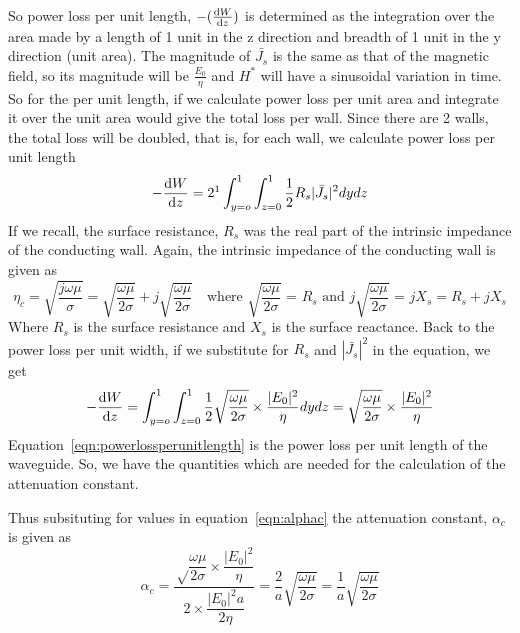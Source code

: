 So power loss per unit length, $-(\derivative{W}{z})$ is determined as the integration over the area made by a length of 1 unit in the z direction and breadth of 1 unit in the y direction (unit area). The magnitude of $ \bar{J_s} $ is the same as that of the magnetic field, so its magnitude will be $ \frac{E_0}{\eta} $ and $H^\ast$ will have a sinusoidal variation in time. So for the per unit length, if we calculate power loss per unit area and integrate it over the unit area would give the total loss per wall. Since there are 2 walls, the total loss will be doubled, that is, for each wall, we calculate power loss per unit length
\begin{equation*}
-\derivative{W}{z} = 2\footnotemark \int_{y=o}^{1} \int_{z=0}^{1}\frac{1}{2}R_s|\bar{J_s}|^2dydz
\end{equation*}
If we recall, the surface resistance, $R_s$ was the real part of the intrinsic impedance of the conducting wall. Again, the intrinsic impedance of the conducting wall is given as
\begin{dmath*}
\eta_c = \sqrt{\frac{j\omega\mu}{\sigma}}
= \sqrt{\frac{\omega\mu}{2\sigma}}+j\sqrt{\frac{\omega\mu}{2\sigma}}\quad\text{where }\sqrt{\frac{\omega\mu}{2\sigma}}\text{ = }R_s\text{ and }j\sqrt{\frac{\omega\mu}{2\sigma}}\text{ = }jX_s
= R_s + jX_s
\end{dmath*}
Where $R_s$ is the surface resistance and $X_s$ is the surface reactance. Back to the power loss per unit width, if we substitute for $R_s$ and $|\bar{J_s}|^2$ in the equation, we get
\begin{dmath}
-\derivative{W}{z} = \int_{y=o}^{1} \int_{z=0}^{1}\frac{1}{2}\sqrt{\frac{\omega\mu}{2\sigma}}\times\frac{|E_0|^2}{\eta}dydz
= \sqrt{\frac{\omega\mu}{2\sigma}}\times\frac{|E_0|^2}{\eta}
\label{eqn:powerlossperunitlength}
\end{dmath}
Equation~\eqref{eqn:powerlossperunitlength} is the power loss per unit length of the waveguide. So, we have the quantities which are needed for the calculation of the attenuation constant.

Thus subsituting for values in equation~\eqref{eqn:alphac} the attenuation constant, $\alpha_c$ is given as 
\begin{dmath}
\alpha_c = \frac{\sqrt\dfrac{\omega\mu}{2 \sigma}\times\dfrac{|E_0|^2}{\eta}}{2 \times \dfrac{|E_0|^2 a}{2 \eta}}
= \frac{2}{a}\sqrt{\frac{\omega\mu}{2\sigma}}=\frac{1}{a}\sqrt{\frac{\omega\mu}{2\sigma}}
\end{dmath}

